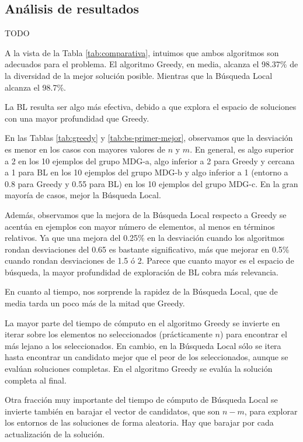 \documentclass{article}
\begin{document}
\subsection{Análisis de resultados}

TODO

A la vista de la Tabla \ref{tab:comparativa}, intuimos que ambos algoritmos son adecuados para el problema.
El algoritmo Greedy, en media, alcanza el 98.37\% de la diversidad de la mejor solución posible. Mientras que la Búsqueda Local
 alcanza el 98.7\%.
 
 La BL resulta ser algo más efectiva, debido a que explora el espacio de soluciones con una mayor profundidad que Greedy.
 
 En las Tablas \ref{tab:greedy} y \ref{tab:bs-primer-mejor}, observamos que la desviación es menor en los casos con mayores 
 valores de $n$ y $m$. En general, es algo superior a 2 en los 10 ejemplos del grupo MDG-a, algo inferior a 2 para Greedy y
 cercana a 1 para BL en los 10 ejemplos del grupo MDG-b y algo inferior a 1 (entorno a 0.8 para Greedy y 0.55 para BL) en los 10
  ejemplos del grupo MDG-c. En la gran mayoría de casos, mejor la Búsqueda Local.
  
  Además, observamos que la mejora de la Búsqueda Local respecto a Greedy se acentúa en ejemplos con mayor número de elementos,
  al menos en términos
  relativos. Ya que una mejora del 0.25\% en la desviación cuando los algoritmos rondan desviaciones del 0.65 es bastante
   significativo, más que mejorar en 0.5\% cuando rondan desviaciones de 1.5 ó 2. Parece que cuanto mayor es el espacio de
   búsqueda, la mayor profundidad de exploración de BL cobra más relevancia.
   
  En cuanto al tiempo, nos sorprende la rapidez de la Búsqueda Local, que de media tarda un poco más de la mitad que Greedy.
  
  La mayor parte del tiempo de cómputo en el algoritmo Greedy se invierte en iterar sobre los elementos no seleccionados
   (prácticamente $n$) para encontrar el más lejano a los seleccionados. En cambio, en la Búsqueda Local sólo se itera hasta
   encontrar un candidato mejor que el peor de los seleccionados, aunque se evalúan soluciones completas.
   En el algoritmo Greedy se evalúa la solución completa al final.
   
   Otra fracción muy importante del tiempo de cómputo de Búsqueda Local se invierte también en barajar el vector de candidatos,
   que son $n-m$, para explorar los entornos de las soluciones de forma aleatoria. Hay que barajar por cada actualización de la
   solución.
   
\end{document}
